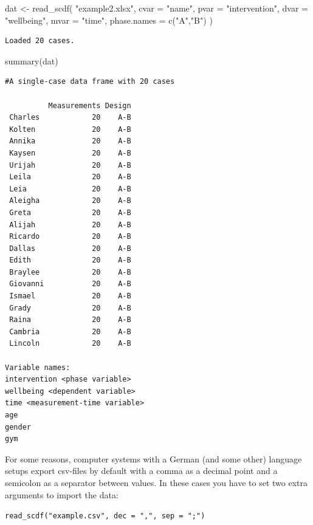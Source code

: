 \documentclass[
  letterpaper,
  DIV=11,
  numbers=noendperiod]{scrreprt}
\newenvironment{Shaded}{\begin{snugshade}}{\end{snugshade}}
\newcommand{\AttributeTok}[1]{\textcolor[rgb]{0.40,0.45,0.13}{#1}}
\newcommand{\FunctionTok}[1]{\textcolor[rgb]{0.28,0.35,0.67}{#1}}
\newcommand{\NormalTok}[1]{\textcolor[rgb]{0.00,0.23,0.31}{#1}}
\newcommand{\OtherTok}[1]{\textcolor[rgb]{0.00,0.23,0.31}{#1}}
\newcommand{\StringTok}[1]{\textcolor[rgb]{0.13,0.47,0.30}{#1}}
\begin{document}
\begin{Shaded}
\begin{Highlighting}[]
\NormalTok{dat }\OtherTok{\textless{}{-}} \FunctionTok{read\_scdf}\NormalTok{(}
  \StringTok{"example2.xlsx"}\NormalTok{, }\AttributeTok{cvar =} \StringTok{"name"}\NormalTok{, }\AttributeTok{pvar =} \StringTok{"intervention"}\NormalTok{, }
  \AttributeTok{dvar =} \StringTok{"wellbeing"}\NormalTok{, }\AttributeTok{mvar =} \StringTok{"time"}\NormalTok{, }\AttributeTok{phase.names =} \FunctionTok{c}\NormalTok{(}\StringTok{"A"}\NormalTok{,}\StringTok{"B"}\NormalTok{)}
\NormalTok{)}
\end{Highlighting}
\end{Shaded}

\begin{verbatim}
Loaded 20 cases.
\end{verbatim}

\begin{Shaded}
\begin{Highlighting}[]
\FunctionTok{summary}\NormalTok{(dat)}
\end{Highlighting}
\end{Shaded}

\begin{verbatim}
#A single-case data frame with 20 cases

          Measurements Design
 Charles            20    A-B
 Kolten             20    A-B
 Annika             20    A-B
 Kaysen             20    A-B
 Urijah             20    A-B
 Leila              20    A-B
 Leia               20    A-B
 Aleigha            20    A-B
 Greta              20    A-B
 Alijah             20    A-B
 Ricardo            20    A-B
 Dallas             20    A-B
 Edith              20    A-B
 Braylee            20    A-B
 Giovanni           20    A-B
 Ismael             20    A-B
 Grady              20    A-B
 Raina              20    A-B
 Cambria            20    A-B
 Lincoln            20    A-B

Variable names:
intervention <phase variable>
wellbeing <dependent variable>
time <measurement-time variable>
age
gender
gym
\end{verbatim}

For some reasons, computer systems with a German (and some other)
language setups export csv-files by default with a comma as a decimal
point and a semicolon as a separator between values. In these cases you
have to set two extra arguments to import the data:

\texttt{read\_scdf("example.csv",\ dec\ =\ ",",\ sep\ =\ ";")}
\end{document}

